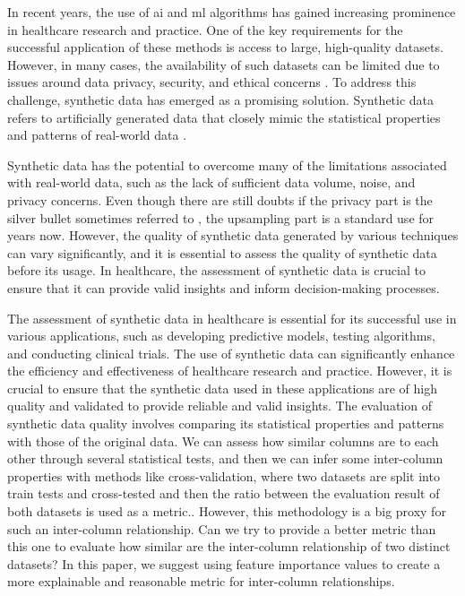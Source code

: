In recent years, the use of \ac{ai} and \ac{ml} algorithms has gained increasing prominence in healthcare research and practice. One of the key requirements for the successful application of these methods is access to large, high-quality datasets. However, in many cases, the availability of such datasets can be limited due to issues around data privacy, security, and ethical concerns \cite{chingOpportunitiesObstaclesDeep2018a}. To address this challenge, synthetic data has emerged as a promising solution. Synthetic data refers to artificially generated data that closely mimic the statistical properties and patterns of real-world data \cite{mullerEvaluationSyntheticElectronic2022}.

Synthetic data has the potential to overcome many of the limitations associated with real-world data, such as the lack of sufficient data volume, noise, and privacy concerns. Even though there are still doubts if the privacy part is the silver bullet sometimes referred to \cite{stadlerSyntheticDataPrivacy2020}, the upsampling part is a standard use for years now. However, the quality of synthetic data generated by various techniques can vary significantly, and it is essential to assess the quality of synthetic data before its usage. In healthcare, the assessment of synthetic data is crucial to ensure that it can provide valid insights and inform decision-making processes.

The assessment of synthetic data in healthcare is essential for its successful use in various applications, such as developing predictive models, testing algorithms, and conducting clinical trials. The use of synthetic data can significantly enhance the efficiency and effectiveness of healthcare research and practice. However, it is crucial to ensure that the synthetic data used in these applications are of high quality and validated to provide reliable and valid insights. The evaluation of synthetic data quality involves comparing its statistical properties and patterns with those of the original data. We can assess how similar columns are to each other through several statistical tests, and then we can infer some inter-column properties with methods like cross-validation, where two datasets are split into train tests and cross-tested and then the ratio between the evaluation result of both datasets is used as a metric.\cite{mullerEvaluationSyntheticElectronic2022,goncalvesGenerationEvaluationSynthetic2020a}. However, this methodology is a big proxy for such an inter-column relationship. Can we try to provide a better metric than this one to evaluate how similar are the inter-column relationship of two distinct datasets? In this paper, we suggest using feature importance values to create a more explainable and reasonable metric for inter-column relationships.

